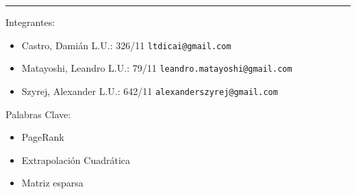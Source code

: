 \rule{16 cm}{0.5 mm}

\vspace{2cm}

Integrantes:
\begin{itemize}
	\item Castro, Dami\'an L.U.: 326/11  \verb+ltdicai@gmail.com+
	\item Matayoshi, Leandro L.U.: 79/11 \verb+leandro.matayoshi@gmail.com+
	\item Szyrej, Alexander L.U.: 642/11   \verb+alexanderszyrej@gmail.com+
	
\end{itemize}

\vspace{2cm}

\begin{abstract}
	En 1996, estudiantes de Stanford comenzaron a desarrollar un nuevo motor de b\'usqueda con un principio en mente: Popularidad de p\'aginas web. Para lograr esto llevaron a cabo un sistema llamado \emph{PageRank}, un m\'etodo que les otorga puntaje a cada una de las p\'aginas en toda la red utilizando un an\'alisis probabil\'istico. El siguiente informe analizar\'a algunas implementaciones para resolver dicho sistema y sus fundamentos de por qu\'e son correctas. Primero veremos el m\'etodo de la potencia con una optimizaci\'on que aprovecha el hecho que la matriz proviene de una matriz esparsa y luego analizaremos el m\'etodo de extrapolaci\'on cuadr\'atica para acelerar el m\'etodo anterior. Como \'ultimo veremos como se comparan ambos m\'etodos y discutiremos los resultados.
\end{abstract}

\vspace{2cm}

Palabras Clave:
\begin{itemize}
	\item PageRank
	\item Extrapolaci\'on Cuadr\'atica
	\item Matriz esparsa
\end{itemize}

